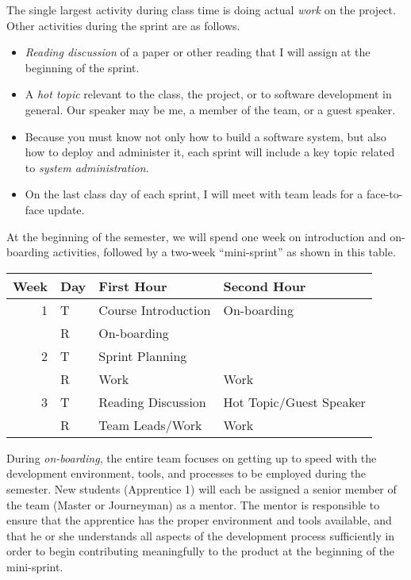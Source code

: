 \documentclass{article}
\begin{document}
The single largest activity during class time is doing actual \emph{work} on the project.
Other activities during the sprint are as follows.
\begin{itemize}
\item \emph{Reading discussion} of a paper or other reading that I will assign at the
beginning of the sprint.
\item A \emph{hot topic} relevant to the class, the project, or to software development in general.
Our speaker may be me, a member of the team, or a guest speaker.
\item Because you must know not only how to build a software system,
but also how to deploy and administer it, each sprint will include
a key topic related to \emph{system administration}.
\item On the last class day of each sprint,
I will meet with team leads for a face-to-face update.
\end{itemize}

At the beginning of the semester,
we will spend one week on introduction and on-boarding activities,
followed by a two-week ``mini-sprint'' as shown in this table.

\begin{center}
\begin{tabular}{rlll}
\toprule
Week & Day & First Hour & Second Hour\\
\midrule
1 & T & Course Introduction & On-boarding\\
 & R & On-boarding & \\
\midrule
2 & T & Sprint Planning & \\
 & R & Work & Work\\
\midrule
3 & T & Reading Discussion & Hot Topic/Guest Speaker\\
 & R & Team Leads/Work & Work\\
\bottomrule
\end{tabular}
\end{center}

During \emph{on-boarding}, the entire team focuses on getting up to speed with the development
environment, tools, and processes to be employed during the semester. New students
(Apprentice 1) will each be assigned a senior member of the team (Master or Journeyman) as
a mentor. The mentor is responsible to ensure that the apprentice has the proper
environment and tools available, and that he or she understands all aspects of the
development process sufficiently in order to begin contributing meaningfully to the
product at the beginning of the mini-sprint.
\end{document}
